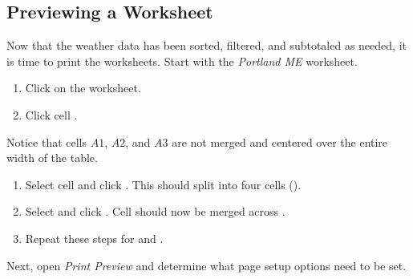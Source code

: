 \subsection{Previewing a Worksheet}

Now that the weather data has been sorted, filtered, and subtotaled as needed, it is time to print the worksheets. Start with the \textit{Portland ME} worksheet.

\begin{enumbox}
	\begin{enumerate}
		\item Click on the  worksheet. 
		\item Click cell .
	\end{enumerate}
\end{enumbox}

Notice that cells $ A1 $, $ A2 $, and $ A3 $ are not merged and centered over the entire width of the table. 

\begin{enumbox}
	\begin{enumerate}
		\item Select cell  and click . This should split  into four cells ().
		\item Select  and click . Cell  should now be merged across .
		\item Repeat these steps for  and .
	\end{enumerate}
\end{enumbox}

Next, open \textit{Print Preview} and determine what page setup options need to be set.

